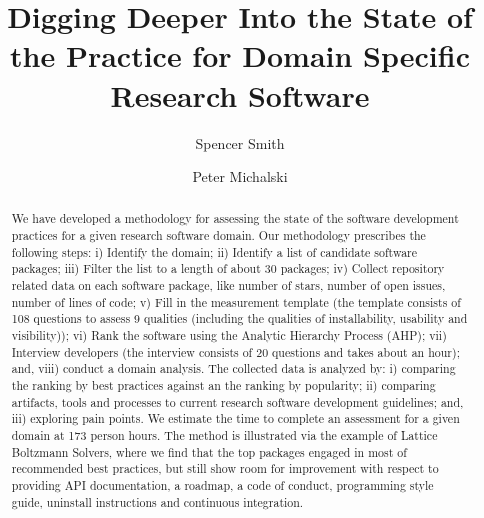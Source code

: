 \documentclass[runningheads]{llncs}
\begin{document}
%
\title{Digging Deeper Into the State of the Practice for Domain Specific Research Software}
%
\author{Spencer Smith \and
Peter Michalski}%
%
%
%
\maketitle %
%
\begin{abstract}

	We have developed a methodology for assessing the state of the software
	development practices for a given research software domain. Our methodology
	prescribes the following steps: i) Identify the domain; ii) Identify a list
	of candidate software packages; iii) Filter the list to a length of about 30
	packages; iv) Collect repository related data on each software package, like
	number of stars, number of open issues, number of lines of code; v) Fill in
	the measurement template (the template consists of 108 questions to assess 9
	qualities (including the qualities of installability, usability and
	visibility)); vi) Rank the software using the Analytic Hierarchy Process
	(AHP); vii) Interview developers (the interview consists of 20 questions and
	takes about an hour); and, viii) conduct a domain analysis. The collected
	data is analyzed by: i) comparing the ranking by best practices against an
	the ranking by popularity; ii) comparing artifacts, tools and processes to
	current research software development guidelines; and, iii) exploring pain
	points. We estimate the time to complete an assessment for a given domain at
	173 person hours. The method is illustrated via the example of Lattice
	Boltzmann Solvers, where we find that the top packages engaged in most of
	recommended best practices, but still show room for improvement with respect
	to providing API documentation, a roadmap, a code of conduct, programming
	style guide, uninstall instructions and continuous integration.


\end{abstract}
\end{document}
